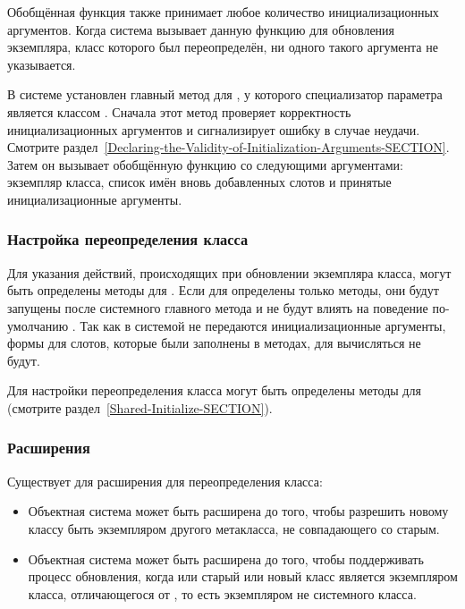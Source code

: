 Обобщённая функция  также принимает
любое количество инициализационных аргументов. Когда система вызывает данную
функцию для обновления экземпляра, класс которого был переопределён, ни одного
такого аргумента не указывается.

В системе установлен главный метод для
, у которого специализатор параметра
является классом . Сначала
этот метод проверяет корректность инициализационных аргументов и сигнализирует
ошибку в случае неудачи. Смотрите
раздел~\ref{Declaring-the-Validity-of-Initialization-Arguments-SECTION}. 
Затем он вызывает обобщённую функцию  со следующими
аргументами: экземпляр класса, список имён вновь добавленных слотов и принятые
инициализационные аргументы.

\subsubsection{Настройка переопределения класса}

Для указания действий, происходящих при обновлении экземпляра класса, могут быть
определены методы для . Если для
 определены только  методы,
они будут запущены после системного главного метода и не будут влиять на
поведение по-умолчанию . Так как в 
 системой не передаются инициализационные
аргументы, формы  для слотов, которые были заполнены в 
методах, для  вычисляться не будут.

Для настройки переопределения класса могут быть определены методы для
 (смотрите раздел~\ref{Shared-Initialize-SECTION}).

\subsubsection{Расширения}

Существует для расширения для переопределения класса:

\begin{itemize}

\item Объектная система может быть расширена до того, чтобы разрешить новому
  классу быть экземпляром другого метакласса, не совпадающего со старым.

\item Объектная система может быть расширена до того, чтобы поддерживать процесс
  обновления, когда или старый или новый класс является экземпляром класса,
  отличающегося от , то есть экземпляром не системного класса.
\end{itemize}

